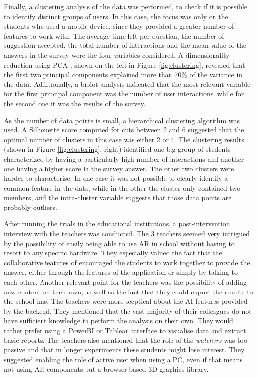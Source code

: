 Finally, a clustering analysis of the data was performed, to check if it is possible to identify distinct groups of users.
In this case, the focus was only on the students who used a mobile device, since they provided a greater number of features to work with.
The average time left per question, the number of suggestion accepted, the total number of interactions and the mean value of the answers in the survey were the four variables considered.
A dimensionality reduction using PCA \citep{jolliffe2002principal}, shown on the left in Figure \ref{fig:clustering}, revealed that the first two principal components explained more than 70\% of the variance in the data.
Additionally, a biplot analysis indicated that the most relevant variable for the first principal component was the number of user interactions, while for the second one it was the results of the survey.

As the number of data points is small, a hierarchical clustering algorithm \citep{hiera} was used.
A Silhouette score \citep{ROUSSEEUW198753} computed for cuts between 2 and 6 suggested that the optimal number of clusters in this case was either 2 or 4.
The clustering results (shown in Figure \ref{fig:clustering}, right) identified one big group of students characterized by having a particularly high number of interactions and another one having a higher score in the survey answer.
The other two clusters were harder to characterise.
In one case it was not possible to clearly identify a common feature in the data, while in the other the cluster only contained two members, and the intra-cluster variable suggests that those data points are probably outliers.

After running the trials in the educational institutions, a post-intervention interview with the teachers was conducted.
The 3 teachers seemed very intrigued by the possibility of easily being able to use AR in school without having to resort to any specific hardware. They especially valued the fact that the collaborative features of \appname{} encouraged the students to work together to provide the answer, either through the features of the application or simply by talking to each other.
Another relevant point for the teachers was the possibility of adding new content on their own, as well as the fact that they could export the results to the school \gls{lms}.
The teachers were more sceptical about the AI features provided by the backend. They mentioned that the vast majority of their colleagues do not have sufficient knowledge to perform the analysis on their own. They would rather prefer using a PowerBI or Tableau interface to visualise data and extract basic reports.
The teachers also mentioned that the role of the \textit{watchers} was too passive and that in longer experiments these students might lose interest. They suggested enabling the role of active user when using a PC, even if that means not using AR components but a browser-based 3D graphics library.

